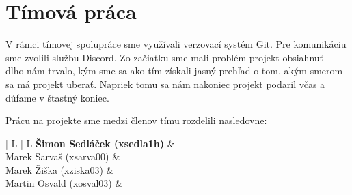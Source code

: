 \documentclass{article}
\begin{document}
	\section{Tímová práca}
	V rámci tímovej spolupráce sme využívali verzovací systém Git. Pre komunikáciu sme zvolili službu Discord.
	Zo začiatku sme mali problém projekt obsiahnuť - dlho nám trvalo, kým sme sa ako tím získali jasný prehľad o tom, akým smerom sa má projekt uberať. Napriek tomu sa nám nakoniec projekt podaril včas a dúfame v štastný koniec.
	
		Prácu na projekte sme medzi členov tímu rozdelili nasledovne:
	\begin{center}
		\begin{tabular}{| L | L}
			\hline
			\textbf{Šimon Sedláček (xsedla1h)} & \\\hline
			Marek Sarvaš (xsarva00) & \\\hline
			Marek Žiška (xziska03) & \\\hline
			Martin Osvald (xosval03) & \\\hline
		\end{tabular}
	\end{center}
	
	
	
	
\end{document}
